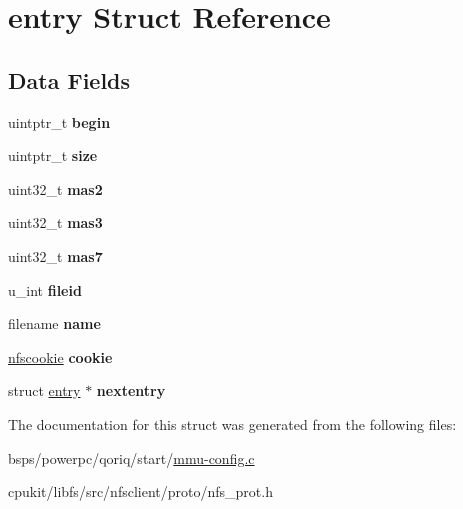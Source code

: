 \hypertarget{structentry}{}\section{entry Struct Reference}
\label{structentry}
\subsection*{Data Fields}
\begin{DoxyCompactItemize}
\item 
\mbox{\label{structentry_aaaaa034096fdff5c0dfb7ab4c08703c9}} 
uintptr\+\_\+t {\bfseries begin}
\item 
\mbox{\label{structentry_ad793311bfa29d38139aca0bb1da4bead}} 
uintptr\+\_\+t {\bfseries size}
\item 
\mbox{\label{structentry_aea85098c86981e27c63ec214fde7f631}} 
uint32\+\_\+t {\bfseries mas2}
\item 
\mbox{\label{structentry_ae613ded6c72977c845fd41878131c134}} 
uint32\+\_\+t {\bfseries mas3}
\item 
\mbox{\label{structentry_a79900c790915af7bdfd266f2f90b3f6b}} 
uint32\+\_\+t {\bfseries mas7}
\item 
\mbox{\label{structentry_a79a198a279ea468dbcdf7814e4caf4cc}} 
u\+\_\+int {\bfseries fileid}
\item 
\mbox{\label{structentry_a917033501d484317790471655bf4aa9a}} 
filename {\bfseries name}
\item 
\mbox{\label{structentry_a46919082018c7f29934f175e15a52803}} 
\mbox{\hyperlink{structnfscookie}{nfscookie}} {\bfseries cookie}
\item 
\mbox{\label{structentry_a7731cf2a128217811d128e1de4bc463e}} 
struct \mbox{\hyperlink{structentry}{entry}} $\ast$ {\bfseries nextentry}
\end{DoxyCompactItemize}


The documentation for this struct was generated from the following files\+:\begin{DoxyCompactItemize}
\item 
bsps/powerpc/qoriq/start/\mbox{\hyperlink{powerpc_2qoriq_2start_2mmu-config_8c}{mmu-\/config.\+c}}\item 
cpukit/libfs/src/nfsclient/proto/nfs\+\_\+prot.\+h\end{DoxyCompactItemize}
